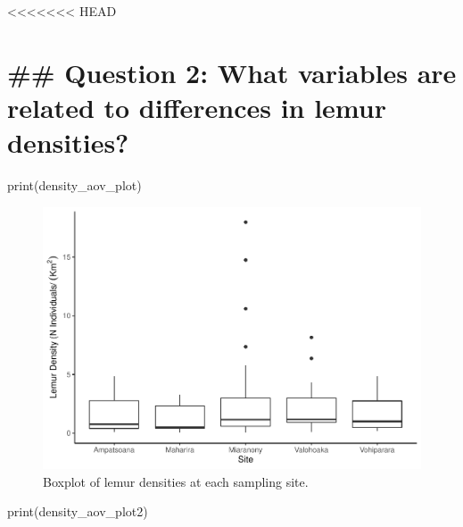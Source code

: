 \documentclass[
  12pt,
]{article}
\newenvironment{Shaded}{\begin{snugshade}}{\end{snugshade}}
\newcommand{\FunctionTok}[1]{\textcolor[rgb]{0.00,0.00,0.00}{#1}}
\newcommand{\NormalTok}[1]{#1}
\begin{document}
\textless\textless\textless\textless\textless\textless\textless{} HEAD

\hypertarget{question-2-what-variables-are-related-to-differences-in-lemur-densities}{%
\section{\#\# Question 2: What variables are related to differences in
lemur
densities?}\label{question-2-what-variables-are-related-to-differences-in-lemur-densities}}

\begin{Shaded}
\begin{Highlighting}[]
\FunctionTok{print}\NormalTok{(density\_aov\_plot)}
\end{Highlighting}
\end{Shaded}

\begin{figure}
\centering
\includegraphics{project_draft_files/figure-latex/unnamed-chunk-5-1.pdf}
\caption{Boxplot of lemur densities at each sampling site.}
\end{figure}

\begin{Shaded}
\begin{Highlighting}[]
\FunctionTok{print}\NormalTok{(density\_aov\_plot2)}
\end{Highlighting}
\end{Shaded}
\end{document}
